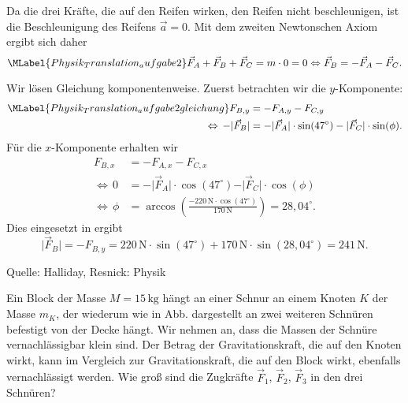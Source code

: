 \begin{MExercises}
\begin{MExercise}
               
               \begin{MSolution}
               Da die drei Kr\"afte, die auf den Reifen wirken, den Reifen nicht beschleunigen, ist die Beschleunigung des Reifens $\vec{a}=0$. Mit dem zweiten Newtonschen Axiom ergibt sich daher
               \begin{equation}\MLabel{Physik_Translation_aufgabe2}
               \vec{F}_A+\vec{F}_B+\vec{F}_C=m\cdot 0 =0 \Leftrightarrow \vec{F}_B=-\vec{F}_A-\vec{F}_C.
               \end{equation}
               
               Wir l\"osen Gleichung  komponentenweise. Zuerst betrachten wir die $y$-Komponente:
               \begin{eqnarray}\MLabel{Physik_Translation_aufgabe2gleichung}
               \nonumber F_{B,y}&=-F_{A,y}-F_{C,y}\\
               \Leftrightarrow\,-\vert \vec{F}_{B}\vert&= -\vert \vec{F}_{A}\vert\cdot\sin(47^{\circ})-\vert\vec{F}_{C}\vert\cdot\sin(\phi).
               \end{eqnarray} F\"ur die $x$-Komponente erhalten wir
               \begin{eqnarray*}
               F_{B,x}&=-F_{A,x}-F_{C,x}\\
               \Leftrightarrow\,0&=-\vert \vec{F}_{A}\vert\cdot\cos(47^{\circ})-\vert \vec{F}_{C}\vert\cdot\cos(\phi)\\
               \Leftrightarrow\,\phi&=\arccos \left(\frac{-220\, \text{N}\cdot\cos(47^{\circ})}{170\,\text{N}}\right)= {28,04}^{\circ}.
               \end{eqnarray*}Dies eingesetzt in  ergibt
               $$
               \vert \vec{F}_B\vert=-F_{B,y}=220\,\text{N}\cdot\sin(47^{\circ})+170 \,\text{N}\cdot\sin({28,04}^{\circ})=241\,\text{N}.
               $$
               
               \end{MSolution}
               
               Quelle: Halliday, Resnick: Physik
               \end{MExercise}
               
               \begin{MExercise}
               Ein Block der Masse $M=15\, \text{kg}$ h\"angt an einer Schnur an einem Knoten $K$ der Masse $m_K$, der wiederum wie in Abb. dargestellt an zwei weiteren Schn\"uren befestigt von der Decke h\"angt. Wir nehmen an, dass die Massen der Schn\"ure vernachl\"assigbar klein sind. Der Betrag der Gravitationskraft, die auf den Knoten wirkt, kann im Vergleich zur Gravitationskraft, die auf den Block wirkt, ebenfalls vernachl\"assigt werden. Wie gro{\ss} sind die Zugkr\"afte $\vec{F}_1$, $\vec{F}_2$, $\vec{F}_3$ in den drei Schn\"uren?
               

\end{MExercise}
\end{MExercises}
